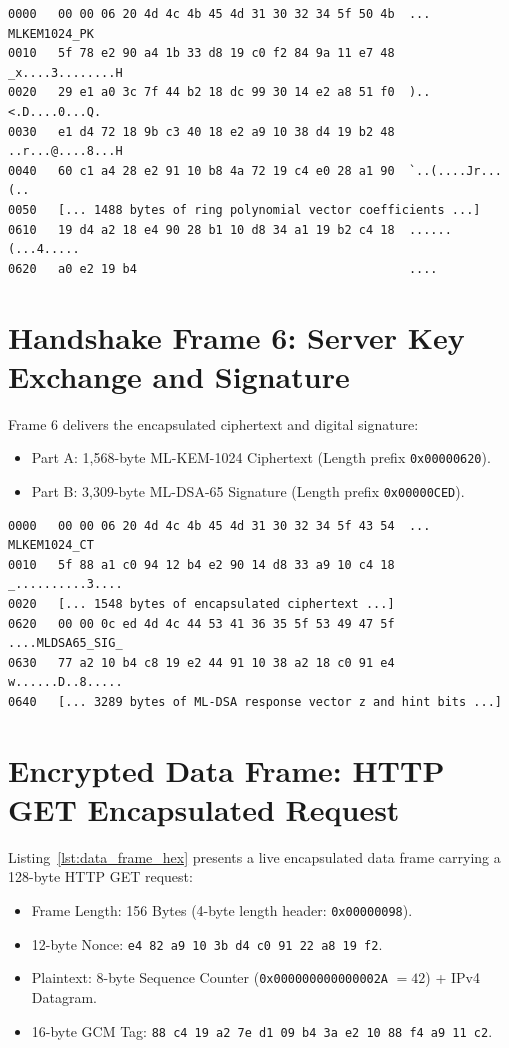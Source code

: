 \begin{lstlisting}[basicstyle=\ttfamily\scriptsize, caption={Hex Dump Excerpt of Handshake Frame 5 (ML-KEM-1024 Public Key).}]
0000   00 00 06 20 4d 4c 4b 45 4d 31 30 32 34 5f 50 4b  ... MLKEM1024_PK
0010   5f 78 e2 90 a4 1b 33 d8 19 c0 f2 84 9a 11 e7 48  _x....3........H
0020   29 e1 a0 3c 7f 44 b2 18 dc 99 30 14 e2 a8 51 f0  )..<.D....0...Q.
0030   e1 d4 72 18 9b c3 40 18 e2 a9 10 38 d4 19 b2 48  ..r...@....8...H
0040   60 c1 a4 28 e2 91 10 b8 4a 72 19 c4 e0 28 a1 90  `..(....Jr...(..
0050   [... 1488 bytes of ring polynomial vector coefficients ...]
0610   19 d4 a2 18 e4 90 28 b1 10 d8 34 a1 19 b2 c4 18  ......(...4.....
0620   a0 e2 19 b4                                      ....
\end{lstlisting}

\section{Handshake Frame 6: Server Key Exchange and Signature}

Frame 6 delivers the encapsulated ciphertext and digital signature:
\begin{itemize}
    \item Part A: 1,568-byte ML-KEM-1024 Ciphertext (Length prefix \texttt{0x00000620}).
    \item Part B: 3,309-byte ML-DSA-65 Signature (Length prefix \texttt{0x00000CED}).
\end{itemize}

\begin{lstlisting}[basicstyle=\ttfamily\scriptsize, caption={Hex Dump Excerpt of Handshake Frame 6 (Ciphertext and Signature).}]
0000   00 00 06 20 4d 4c 4b 45 4d 31 30 32 34 5f 43 54  ... MLKEM1024_CT
0010   5f 88 a1 c0 94 12 b4 e2 90 14 d8 33 a9 10 c4 18  _..........3....
0020   [... 1548 bytes of encapsulated ciphertext ...]
0620   00 00 0c ed 4d 4c 44 53 41 36 35 5f 53 49 47 5f  ....MLDSA65_SIG_
0630   77 a2 10 b4 c8 19 e2 44 91 10 38 a2 18 c0 91 e4  w......D..8.....
0640   [... 3289 bytes of ML-DSA response vector z and hint bits ...]
\end{lstlisting}

\section{Encrypted Data Frame: HTTP GET Encapsulated Request}

Listing~\ref{lst:data_frame_hex} presents a live encapsulated data frame carrying a 128-byte HTTP GET request:
\begin{itemize}
    \item Frame Length: 156 Bytes (4-byte length header: \texttt{0x00000098}).
    \item 12-byte Nonce: \texttt{e4 82 a9 10 3b d4 c0 91 22 a8 19 f2}.
    \item Plaintext: 8-byte Sequence Counter (\texttt{0x000000000000002A} $= 42$) + IPv4 Datagram.
    \item 16-byte GCM Tag: \texttt{88 c4 19 a2 7e d1 09 b4 3a e2 10 88 f4 a9 11 c2}.
\end{itemize}


